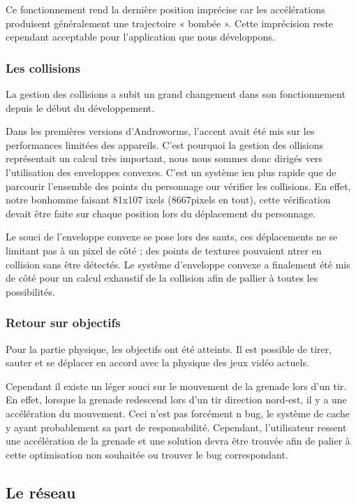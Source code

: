 \documentclass{report}
\begin{document}
Ce fonctionnement rend la dernière position imprécise car les 
accélérations produisent généralement une trajectoire « bombée ». Cette 
imprécision reste cependant acceptable pour l’application que nous 
développons.

\subsubsection{Les collisions}
La gestion des collisions a subit un grand changement dans son 
fonctionnement depuis le début du développement.

Dans les premières versions d’Androworms, l’accent avait été mis sur les
performances limitées des appareils. C’est pourquoi la gestion des
ollisions représentait un calcul très important, nous nous sommes donc
dirigés vers l’utilisation des enveloppes convexes. C’est un système
ien plus rapide que de parcourir l’ensemble des points du personnage
our vérifier les collisions. En effet, notre bonhomme faisant 81x107
ixels (8667pixels en tout), cette vérification devait être faite sur
chaque position lors du déplacement du personnage. 

Le souci de l’enveloppe convexe se pose lors des sauts, ces déplacements
ne se limitant pas à un pixel de côté ; des points de textures pouvaient
ntrer en collision sans être détectés. 
Le système d’enveloppe convexe a finalement été mis de côté pour un
calcul exhaustif de la collision afin de pallier à toutes les
possibilités.

\subsubsection{Retour sur objectifs}

Pour la partie physique, les objectifs ont été atteints. Il est possible
de tirer, sauter et se déplacer en accord avec la physique des jeux
vidéo actuels. 

Cependant il existe un léger souci sur le mouvement de la grenade lors
d’un tir. En effet, lorsque la grenade redescend lors d’un tir direction
nord-est, il y a une accélération du mouvement. Ceci n’est pas forcément
n bug, le système de cache y ayant probablement sa part de
responsabilité. Cependant, l’utilisateur ressent une accélération de la
grenade et une solution devra être trouvée afin de palier à cette
optimisation non souhaitée ou trouver le bug correspondant.


\subsection{Le réseau}
\end{document}

